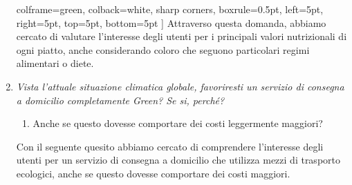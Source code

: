 \documentclass{article}
\begin{document}
\begin{enumerate}
\begin{tcolorbox}
            colframe=green,  %
            colback=white,  %
            sharp corners,  %
            boxrule=0.5pt,  %
            left=5pt,  %
            right=5pt,  %
            top=5pt,  %
            bottom=5pt  %
        ]
        Attraverso questa domanda, abbiamo cercato di valutare l'interesse degli utenti per i principali valori nutrizionali di ogni piatto, anche considerando coloro che seguono particolari regimi alimentari o diete.
        \end{tcolorbox}
    \newpage
    \item \textit{Vista l'attuale situazione climatica globale, favoriresti un servizio di consegna a domicilio completamente Green? Se si, perché? }
        \begin{enumerate}
            \item Anche se questo dovesse comportare dei costi leggermente maggiori?
        \end{enumerate}
        \begin{tcolorbox}[
            colframe=green,  %
            colback=white,  %
            sharp corners,  %
            boxrule=0.5pt,  %
            left=5pt,  %
            right=5pt,  %
            top=5pt,  %
            bottom=5pt  %
        ]
        Con il seguente quesito abbiamo cercato di comprendere l'interesse degli utenti per un servizio di consegna a domicilio che utilizza mezzi di trasporto ecologici, anche se questo dovesse comportare dei costi maggiori.

        \end{tcolorbox}
\end{enumerate}
\vspace{1cm}\par
{}\vspace{0.5cm}
\end{document}
